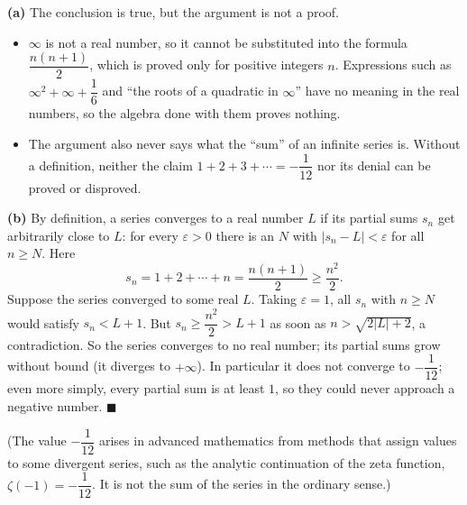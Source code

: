 \textbf{(a)} The conclusion is true, but the argument is not a proof.
\begin{itemize}
\item $\infty$ is not a real number, so it cannot be substituted into the formula $\dfrac{n(n+1)}{2}$, which is proved only for positive integers $n$. Expressions such as $\infty^2+\infty+\dfrac{1}{6}$ and ``the roots of a quadratic in $\infty$'' have no meaning in the real numbers, so the algebra done with them proves nothing.
\item The argument also never says what the ``sum'' of an infinite series is. Without a definition, neither the claim $1+2+3+\cdots=-\dfrac{1}{12}$ nor its denial can be proved or disproved.
\end{itemize}

\textbf{(b)} By definition, a series converges to a real number $L$ if its partial sums $s_n$ get arbitrarily close to $L$: for every $\varepsilon>0$ there is an $N$ with $|s_n-L|<\varepsilon$ for all $n\ge N$. Here
\[
s_n=1+2+\cdots+n=\dfrac{n(n+1)}{2}\ge\dfrac{n^2}{2}.
\]
Suppose the series converged to some real $L$. Taking $\varepsilon=1$, all $s_n$ with $n\ge N$ would satisfy $s_n<L+1$. But $s_n\ge\dfrac{n^2}{2}>L+1$ as soon as $n>\sqrt{2|L|+2}$, a contradiction. So the series converges to no real number; its partial sums grow without bound (it diverges to $+\infty$). In particular it does not converge to $-\dfrac{1}{12}$; even more simply, every partial sum is at least $1$, so they could never approach a negative number. $\blacksquare$

(The value $-\dfrac{1}{12}$ arises in advanced mathematics from methods that assign values to some divergent series, such as the analytic continuation of the zeta function, $\zeta(-1)=-\dfrac{1}{12}$. It is not the sum of the series in the ordinary sense.)
